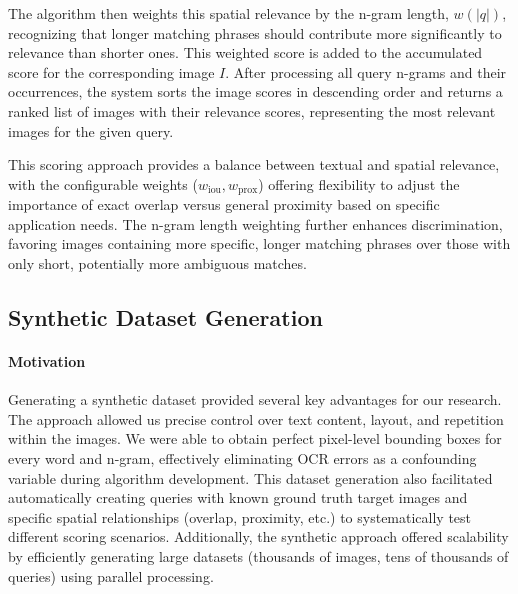 \documentclass[sigconf,screen]{acmart}
\begin{document}
The algorithm then weights this spatial relevance by the n-gram length, $w(\lvert q \rvert)$, recognizing that longer matching phrases should contribute more significantly to relevance than shorter ones. This weighted score is added to the accumulated score for the corresponding image $I$. After processing all query n-grams and their occurrences, the system sorts the image scores in descending order and returns a ranked list of images with their relevance scores, representing the most relevant images for the given query.

This scoring approach provides a balance between textual and spatial relevance, with the configurable weights ($w_{\text{iou}}, w_{\text{prox}}$) offering flexibility to adjust the importance of exact overlap versus general proximity based on specific application needs. The n-gram length weighting further enhances discrimination, favoring images containing more specific, longer matching phrases over those with only short, potentially more ambiguous matches.

\subsection{Synthetic Dataset Generation}
\label{sec:synthetic_data}

\paragraph{Motivation} Generating a synthetic dataset provided several key advantages for our research. The approach allowed us precise control over text content, layout, and repetition within the images. We were able to obtain perfect pixel-level bounding boxes for every word and n-gram, effectively eliminating OCR errors as a confounding variable during algorithm development. This dataset generation also facilitated automatically creating queries with known ground truth target images and specific spatial relationships (overlap, proximity, etc.) to systematically test different scoring scenarios. Additionally, the synthetic approach offered scalability by efficiently generating large datasets (thousands of images, tens of thousands of queries) using parallel processing.
\end{document}
